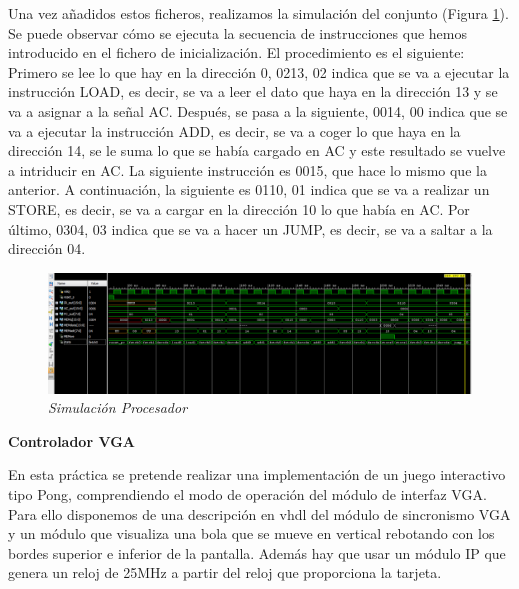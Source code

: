 Una vez añadidos estos ficheros, realizamos la simulación del conjunto (Figura \ref{procesador}). Se puede observar cómo se 
ejecuta la secuencia de instrucciones que hemos introducido en el fichero de inicialización. El procedimiento es el siguiente: 
Primero se lee lo que hay en la dirección 0, 0213, 02 indica que se va a ejecutar la instrucción LOAD, es decir, se va a leer el 
dato que haya en la dirección 13 y se va a asignar a la señal AC. Después, se pasa a la siguiente, 0014, 00 indica que se va 
a ejecutar la instrucción ADD, es decir, se va a coger lo que haya en la dirección 14, se le suma lo que se había cargado en AC y 
este resultado se vuelve a intriducir en AC. La siguiente instrucción es 0015, que hace lo mismo que la anterior. A continuación, 
la siguiente es 0110, 01 indica que se va a realizar un STORE, es decir, se va a cargar en la dirección 10 lo que había en AC. Por 
último, 0304, 03 indica que se va a hacer un JUMP, es decir, se va a saltar a la dirección 04.

\begin{figure}[H]
    \centering
    \includegraphics[width = 1\textwidth]{imagenes/procesador.png}
    \caption{\textit{Simulación Procesador}}\label{procesador}
\end{figure}

\textbf{Controlador VGA}

En esta práctica se pretende realizar una implementación de un juego interactivo tipo Pong, comprendiendo el modo de operación 
del módulo de interfaz VGA. Para ello disponemos de una descripción en vhdl del módulo de sincronismo VGA y un módulo que visualiza 
una bola que se mueve en vertical rebotando con los bordes superior e inferior de la pantalla. Además hay que usar un módulo IP que 
genera un reloj de 25MHz a partir del reloj que proporciona la tarjeta.

